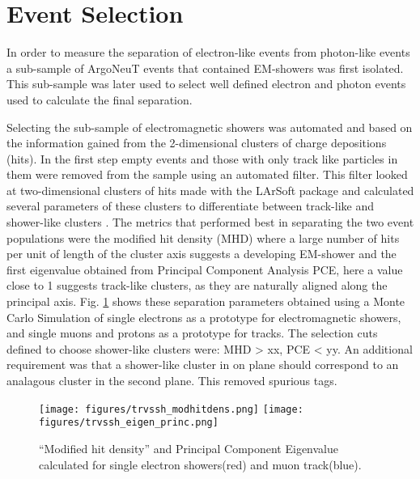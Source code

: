 
\section{Event Selection}
\label{sec:Selection}

In order to measure the separation of electron-like events from photon-like events  
a sub-sample of ArgoNeuT events that contained EM-showers was first isolated. This sub-sample was later used to select well defined electron and photon events
used to calculate the final separation.


Selecting the sub-sample of electromagnetic showers was automated and based on the information gained 
from the 2-dimensional clusters of charge depositions (hits). In the first step 
 empty events and those with only track like particles in them were removed from the sample using 
 an automated filter. This filter looked at two-dimensional clusters of hits made with the LArSoft package 
and calculated several parameters of these clusters to differentiate between track-like and shower-like clusters 
\cite{LArSoft}. The metrics that performed best in separating the two event populations were the modified hit density (MHD) 
where a large number of hits per unit of length of the cluster axis suggests a developing EM-shower and the first eigenvalue
obtained from Principal Component Analysis PCE, here a value close to 1 suggests track-like clusters, as they are naturally aligned along
the principal axis.
Fig. \ref{fig:separation} shows these separation 
parameters obtained using a Monte Carlo Simulation of single electrons as a prototype for electromagnetic showers, and 
single muons and protons as a prototype for tracks. The selection cuts defined to choose shower-like clusters were:
MHD > xx, PCE < yy. An additional requirement was that a shower-like cluster in on plane should correspond 
to an analagous cluster in the second plane. This removed spurious tags.


\begin{figure}[h]
\centering
\texttt{[image: figures/trvssh\_modhitdens.png]}
\texttt{[image: figures/trvssh\_eigen\_princ.png]}
\caption{\label{fig:separation} ``Modified hit density'' and Principal Component 
Eigenvalue calculated for single electron showers(red) and muon track(blue).}
\end{figure}

